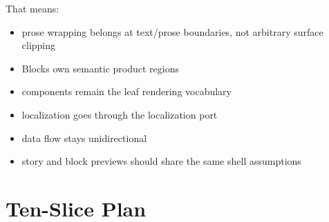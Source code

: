 That means:

\begin{itemize}
\tightlist
\item
  prose wrapping belongs at text/prose boundaries, not arbitrary surface clipping
\item
  Blocks own semantic product regions
\item
  components remain the leaf rendering vocabulary
\item
  localization goes through the localization port
\item
  data flow stays unidirectional
\item
  story and block previews should share the same shell assumptions
\end{itemize}

\section{Ten-Slice Plan}\label{record-110-ten-slice-plan}

